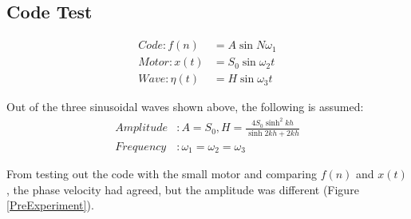 \subsection{Code Test}
\begin{align*}
    Code: f(n) &= A \sin{N \omega_{1}}\\
    Motor: x(t) &= S_{0} \sin{\omega_{2} t}\\
    Wave: \eta(t) &= H \sin{\omega_{3} t}
\end{align*}

Out of the three sinusoidal waves shown above, the following is assumed:
\begin{align*}
    Amplitude&: A = S_0, H = \frac{4 S_0 \sinh^2 {kh}}{\sinh{2kh} + 2kh}\\
    Frequency&: \omega_{1} = \omega_{2} = \omega_{3}
\end{align*}

From testing out the code with the small motor and comparing $f(n)$ and $x(t)$, the phase velocity had agreed, but the amplitude was different (Figure \ref{PreExperiment}).

